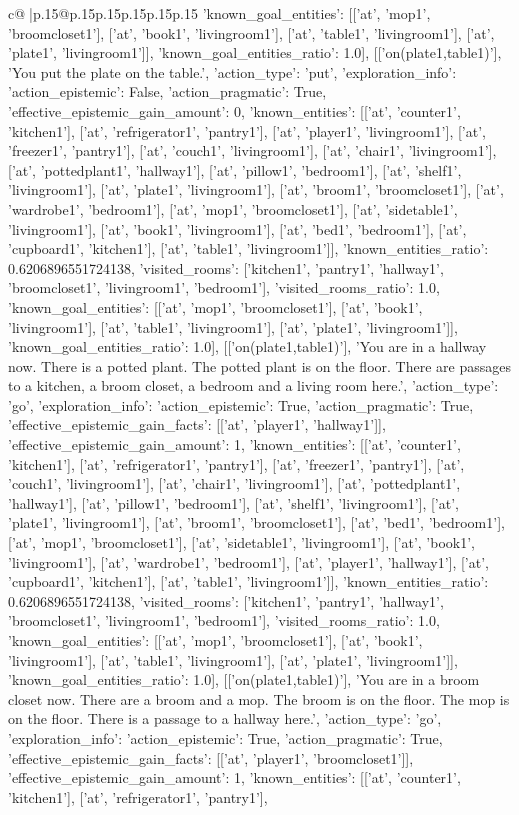 \documentclass{article}
\begin{document}
{\begin{supertabular}{c@{$\;$}|p{.15\linewidth}@{}p{.15\linewidth}p{.15\linewidth}p{.15\linewidth}p{.15\linewidth}p{.15\linewidth}}
{{{'known_goal_entities': [['at', 'mop1', 'broomcloset1'], ['at', 'book1', 'livingroom1'], ['at', 'table1', 'livingroom1'], ['at', 'plate1', 'livingroom1']], 'known_goal_entities_ratio': 1.0}}], [['on(plate1,table1)'], 'You put the plate on the table.', {'action_type': 'put', 'exploration_info': {'action_epistemic': False, 'action_pragmatic': True, 'effective_epistemic_gain_amount': 0, 'known_entities': [['at', 'counter1', 'kitchen1'], ['at', 'refrigerator1', 'pantry1'], ['at', 'player1', 'livingroom1'], ['at', 'freezer1', 'pantry1'], ['at', 'couch1', 'livingroom1'], ['at', 'chair1', 'livingroom1'], ['at', 'pottedplant1', 'hallway1'], ['at', 'pillow1', 'bedroom1'], ['at', 'shelf1', 'livingroom1'], ['at', 'plate1', 'livingroom1'], ['at', 'broom1', 'broomcloset1'], ['at', 'wardrobe1', 'bedroom1'], ['at', 'mop1', 'broomcloset1'], ['at', 'sidetable1', 'livingroom1'], ['at', 'book1', 'livingroom1'], ['at', 'bed1', 'bedroom1'], ['at', 'cupboard1', 'kitchen1'], ['at', 'table1', 'livingroom1']], 'known_entities_ratio': 0.6206896551724138, 'visited_rooms': ['kitchen1', 'pantry1', 'hallway1', 'broomcloset1', 'livingroom1', 'bedroom1'], 'visited_rooms_ratio': 1.0, 'known_goal_entities': [['at', 'mop1', 'broomcloset1'], ['at', 'book1', 'livingroom1'], ['at', 'table1', 'livingroom1'], ['at', 'plate1', 'livingroom1']], 'known_goal_entities_ratio': 1.0}}], [['on(plate1,table1)'], 'You are in a hallway now. There is a potted plant. The potted plant is on the floor. There are passages to a kitchen, a broom closet, a bedroom and a living room here.', {'action_type': 'go', 'exploration_info': {'action_epistemic': True, 'action_pragmatic': True, 'effective_epistemic_gain_facts': [['at', 'player1', 'hallway1']], 'effective_epistemic_gain_amount': 1, 'known_entities': [['at', 'counter1', 'kitchen1'], ['at', 'refrigerator1', 'pantry1'], ['at', 'freezer1', 'pantry1'], ['at', 'couch1', 'livingroom1'], ['at', 'chair1', 'livingroom1'], ['at', 'pottedplant1', 'hallway1'], ['at', 'pillow1', 'bedroom1'], ['at', 'shelf1', 'livingroom1'], ['at', 'plate1', 'livingroom1'], ['at', 'broom1', 'broomcloset1'], ['at', 'bed1', 'bedroom1'], ['at', 'mop1', 'broomcloset1'], ['at', 'sidetable1', 'livingroom1'], ['at', 'book1', 'livingroom1'], ['at', 'wardrobe1', 'bedroom1'], ['at', 'player1', 'hallway1'], ['at', 'cupboard1', 'kitchen1'], ['at', 'table1', 'livingroom1']], 'known_entities_ratio': 0.6206896551724138, 'visited_rooms': ['kitchen1', 'pantry1', 'hallway1', 'broomcloset1', 'livingroom1', 'bedroom1'], 'visited_rooms_ratio': 1.0, 'known_goal_entities': [['at', 'mop1', 'broomcloset1'], ['at', 'book1', 'livingroom1'], ['at', 'table1', 'livingroom1'], ['at', 'plate1', 'livingroom1']], 'known_goal_entities_ratio': 1.0}}], [['on(plate1,table1)'], 'You are in a broom closet now. There are a broom and a mop. The broom is on the floor. The mop is on the floor. There is a passage to a hallway here.', {'action_type': 'go', 'exploration_info': {'action_epistemic': True, 'action_pragmatic': True, 'effective_epistemic_gain_facts': [['at', 'player1', 'broomcloset1']], 'effective_epistemic_gain_amount': 1, 'known_entities': [['at', 'counter1', 'kitchen1'], ['at', 'refrigerator1', 'pantry1'], }}}
\end{supertabular}}
\end{document}

